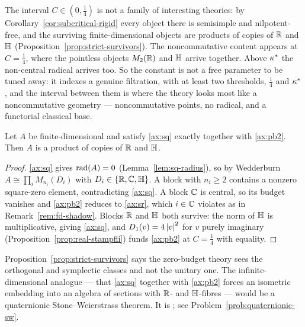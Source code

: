 \begin{remark}
The interval $C\in(0,\tfrac14)$ is not a family of interesting theories: by
Corollary~\ref{cor:subcritical-rigid} every object there is semisimple and
nilpotent-free, and the surviving finite-dimensional objects are products of
copies of $\mathbb{R}$ and $\mathbb{H}$ (Proposition~\ref{prop:strict-survivors}).  The
noncommutative content appears at $C=\tfrac14$, where the pointless objects
$M_2(\mathbb{R})$ and $\mathbb{H}$ arrive together.  Above $\kappa^*$ the non-central radical
arrives too.  So the constant is not a free parameter to be tuned away: it
indexes a genuine filtration, with at least two thresholds,
$\tfrac14$ and $\kappa^*$, and the interval between them is where the theory looks
most like a noncommutative geometry --- noncommutative points, no radical, and a
functorial classical base.
\end{remark}

\begin{proposition}\label{prop:strict-survivors}
Let $A$ be finite-dimensional and satisfy \eqref{ax:sq} exactly together with
\eqref{ax:pb2}.  Then $A$ is a product of copies of $\mathbb{R}$ and $\mathbb{H}$.
\end{proposition}

\begin{proof}
\eqref{ax:sq} gives $\operatorname{rad}(A)=0$ (Lemma~\ref{lem:sq-radius}), so by
Wedderburn $A\cong\prod_iM_{n_i}(D_i)$ with $D_i\in\{\mathbb{R},\mathbb{C},\mathbb{H}\}$.  A block
with $n_i\ge2$ contains a nonzero square-zero element, contradicting
\eqref{ax:sq}.  A block $\mathbb{C}$ is central, so its budget vanishes and
\eqref{ax:pb2} reduces to \eqref{ax:sr}, which $i\in\mathbb{C}$ violates as in
Remark~\ref{rem:fd-shadow}.  Blocks $\mathbb{R}$ and $\mathbb{H}$ both survive: the norm of
$\mathbb{H}$ is multiplicative, giving \eqref{ax:sq}, and
$D_1(v)=4\left\lvert v\right\rvert^2$ for $v$ purely imaginary
(Proposition~\ref{prop:real-stampfli}) funds \eqref{ax:pb2} at $C=\tfrac14$
with equality.
\end{proof}

\begin{remark}
Proposition~\ref{prop:strict-survivors} says the zero-budget theory sees the
orthogonal and symplectic classes and not the unitary one.  The
infinite-dimensional analogue --- that \eqref{ax:sq} together with
\eqref{ax:pb2} forces an isometric embedding into an algebra of sections with
$\mathbb{R}$- and $\mathbb{H}$-fibres --- would be a quaternionic Stone--Weierstrass theorem.
It is \statusconj; see Problem~\ref{prob:quaternionic-sw}.
\end{remark}
